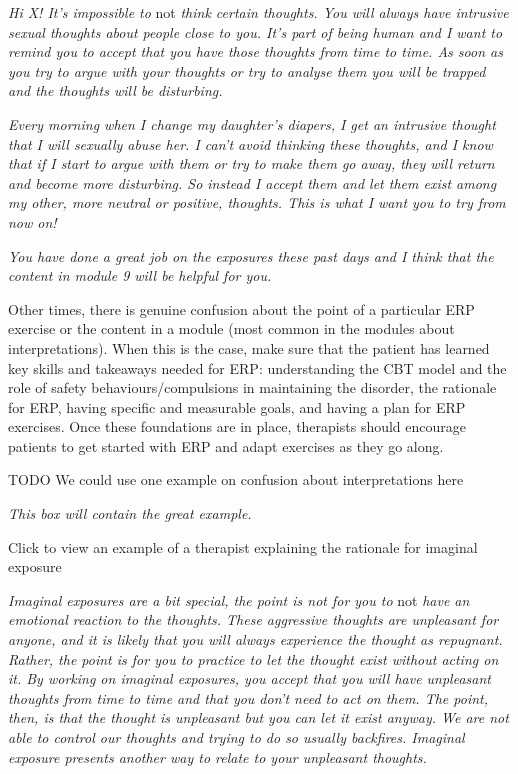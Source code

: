 \documentclass[]{book}
\theoremstyle{definition}
\theoremstyle{definition}
\theoremstyle{definition}
\theoremstyle{remark}
\begin{document}
\emph{Hi X! It's impossible to} not \emph{think certain thoughts. You
will always have intrusive sexual thoughts about people close to you.
It's part of being human and I want to remind you to accept that you
have those thoughts from time to time. As soon as you try to argue with
your thoughts or try to analyse them you will be trapped and the
thoughts will be disturbing.}

\emph{Every morning when I change my daughter's diapers, I get an
intrusive thought that I will sexually abuse her. I can't avoid thinking
these thoughts, and I know that if I start to argue with them or try to
make them go away, they will return and become more disturbing. So
instead I accept them and let them exist among my other, more neutral or
positive, thoughts. This is what I want you to try from now on!}

\emph{You have done a great job on the exposures these past days and I
think that the content in module 9 will be helpful for you.}

Other times, there is genuine confusion about the point of a particular
ERP exercise or the content in a module (most common in the modules
about interpretations). When this is the case, make sure that the
patient has learned key skills and takeaways needed for ERP:
understanding the CBT model and the role of safety
behaviours/compulsions in maintaining the disorder, the rationale for
ERP, having specific and measurable goals, and having a plan for ERP
exercises. Once these foundations are in place, therapists should
encourage patients to get started with ERP and adapt exercises as they
go along.

 TODO We could use one example on confusion about interpretations here

\emph{This box will contain the great example.}

 Click to view an example of a therapist explaining the rationale for
imaginal exposure

\emph{Imaginal exposures are a bit special, the point is not for you to}
not \emph{have an emotional reaction to the thoughts. These aggressive
thoughts are unpleasant for anyone, and it is likely that you will
always experience the thought as repugnant. Rather, the point is for you
to practice to let the thought exist without acting on it. By working on
imaginal exposures, you accept that you will have unpleasant thoughts
from time to time and that you don't need to act on them. The point,
then, is that the thought is unpleasant but you can let it exist anyway.
We are not able to control our thoughts and trying to do so usually
backfires. Imaginal exposure presents another way to relate to your
unpleasant thoughts.}
\end{document}
